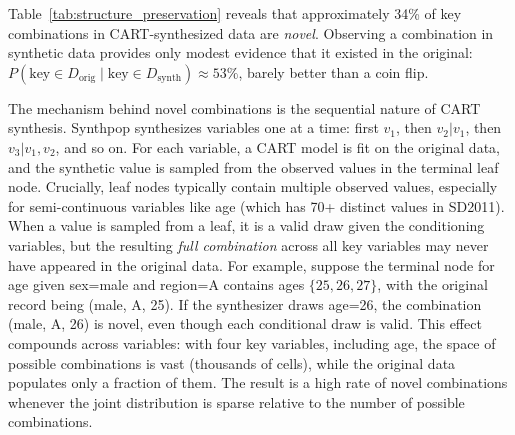\documentclass[Afour,sageh,times,doublespace]{sagej}
\begin{document}
\begin{table}[h]
\footnotesize\sf\centering
\caption{Structure preservation in CART-synthesized SD2011 data.\label{tab:structure_preservation}}
\end{table}

Table~\ref{tab:structure_preservation} reveals that approximately 34\% of key combinations in CART-synthesized data are \textit{novel}. Observing a combination in synthetic data provides only modest evidence that it existed in the original: $P(\text{key} \in D_{\text{orig}} \mid \text{key} \in D_{\text{synth}}) \approx 53\%$, barely better than a coin flip.

The mechanism behind novel combinations is the sequential nature of CART synthesis. Synthpop synthesizes variables one at a time: first $v_1$, then $v_2 | v_1$, then $v_3 | v_1, v_2$, and so on. For each variable, a CART model is fit on the original data, and the synthetic value is sampled from the observed values in the terminal leaf node. Crucially, leaf nodes typically contain multiple observed values, especially for semi-continuous variables like age (which has 70+ distinct values in SD2011). When a value is sampled from a leaf, it is a valid draw given the conditioning variables, but the resulting \textit{full combination} across all key variables may never have appeared in the original data. For example, suppose the terminal node for age given sex=male and region=A contains ages $\{25, 26, 27\}$, with the original record being (male, A, 25). If the synthesizer draws age=26, the combination (male, A, 26) is novel, even though each conditional draw is valid. This effect compounds across variables: with four key variables, including age, the space of possible combinations is vast (thousands of cells), while the original data populates only a fraction of them. The result is a high rate of novel combinations whenever the joint distribution is sparse relative to the number of possible combinations.
\end{document}
